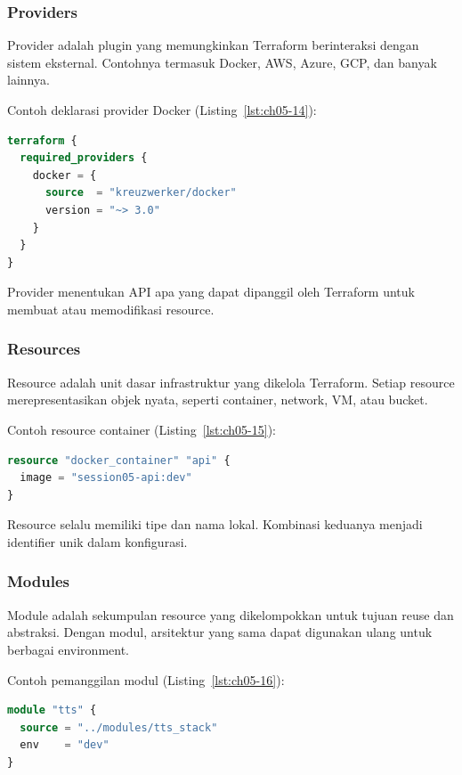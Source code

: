 \subsubsection*{Providers}

Provider adalah plugin yang memungkinkan Terraform berinteraksi dengan sistem eksternal. Contohnya termasuk Docker, AWS, Azure, GCP, dan banyak lainnya.

Contoh deklarasi provider Docker (Listing~\ref{lst:ch05-14}):

\begin{lstlisting}[language=terraform, caption={Potongan kode Terraform pada Providers}, label={lst:ch05-14}]
terraform {
  required_providers {
    docker = {
      source  = "kreuzwerker/docker"
      version = "~> 3.0"
    }
  }
}
\end{lstlisting}

Provider menentukan API apa yang dapat dipanggil oleh Terraform untuk membuat atau memodifikasi resource.

\subsubsection*{Resources}

Resource adalah unit dasar infrastruktur yang dikelola Terraform. Setiap resource merepresentasikan objek nyata, seperti container, network, VM, atau bucket.

Contoh resource container (Listing~\ref{lst:ch05-15}):

\begin{lstlisting}[language=terraform, caption={Potongan kode Terraform pada Resources}, label={lst:ch05-15}]
resource "docker_container" "api" {
  image = "session05-api:dev"
}
\end{lstlisting}

Resource selalu memiliki tipe dan nama lokal. Kombinasi keduanya menjadi identifier unik dalam konfigurasi.

\subsubsection*{Modules}

Module adalah sekumpulan resource yang dikelompokkan untuk tujuan reuse dan abstraksi. Dengan modul, arsitektur yang sama dapat digunakan ulang untuk berbagai environment.

Contoh pemanggilan modul (Listing~\ref{lst:ch05-16}):

\begin{lstlisting}[language=terraform, caption={Potongan kode Terraform pada Modules}, label={lst:ch05-16}]
module "tts" {
  source = "../modules/tts_stack"
  env    = "dev"
}
\end{lstlisting}

